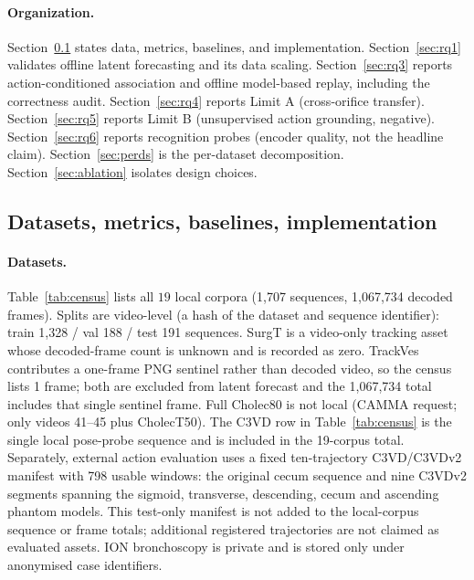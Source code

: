 \documentclass[preprint,12pt]{elsarticle}
\begin{document}
\paragraph{Organization.}
Section~\ref{sec:setup} states data, metrics, baselines, and implementation.
Section~\ref{sec:rq1} validates offline latent forecasting and its data
scaling.
Section~\ref{sec:rq3} reports action-conditioned association and offline
model-based replay, including the correctness audit.
Section~\ref{sec:rq4} reports Limit A (cross-orifice transfer).
Section~\ref{sec:rq5} reports Limit B (unsupervised action grounding, negative).
Section~\ref{sec:rq6} reports recognition probes (encoder quality, not the headline claim).
Section~\ref{sec:perds} is the per-dataset decomposition.
Section~\ref{sec:ablation} isolates design choices.

\subsection{Datasets, metrics, baselines, implementation}
\label{sec:setup}

\paragraph{Datasets.}
Table~\ref{tab:census} lists all $19$ local corpora (1{,}707 sequences,
1{,}067{,}734 decoded frames).
Splits are video-level (a hash of the dataset and sequence identifier): train 1{,}328 / val 188 / test 191 sequences.
SurgT is a video-only tracking asset whose decoded-frame count is unknown and
is recorded as zero. TrackVes contributes a one-frame PNG sentinel rather than
decoded video, so the census lists 1 frame; both are excluded from latent
forecast and the 1{,}067{,}734 total includes that single sentinel frame.
Full Cholec80 is not local (CAMMA request; only videos 41--45 plus CholecT50).
The C3VD row in Table~\ref{tab:census} is the single local pose-probe
sequence and is included in the 19-corpus total. Separately, external action
evaluation uses a fixed ten-trajectory C3VD/C3VDv2 manifest with 798 usable
windows: the original cecum sequence and nine C3VDv2 segments spanning the
sigmoid, transverse, descending, cecum and ascending phantom models. This
test-only manifest is not added to the local-corpus sequence or frame totals;
additional registered trajectories are not claimed as evaluated assets.
ION bronchoscopy is private and is stored only under anonymised case
identifiers.
\end{document}
